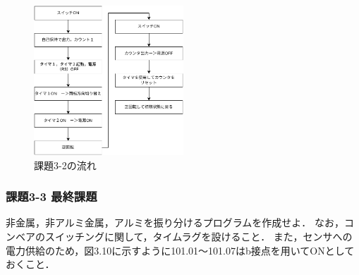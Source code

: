 \begin{figure}[H]
  \centering
  \includegraphics[width=0.5\textwidth]{sozai/12.pdf}
  \caption{課題3-2の流れ}
\end{figure}

\subsubsection*{課題3-3 最終課題}
非金属，非アルミ金属，アルミを振り分けるプログラムを作成せよ．
なお，コンベアのスイッチングに関して，タイムラグを設けること．
また，センサへの電力供給のため，図3.10に示すように101.01〜101.07はb接点を用いてONとしておくこと．
